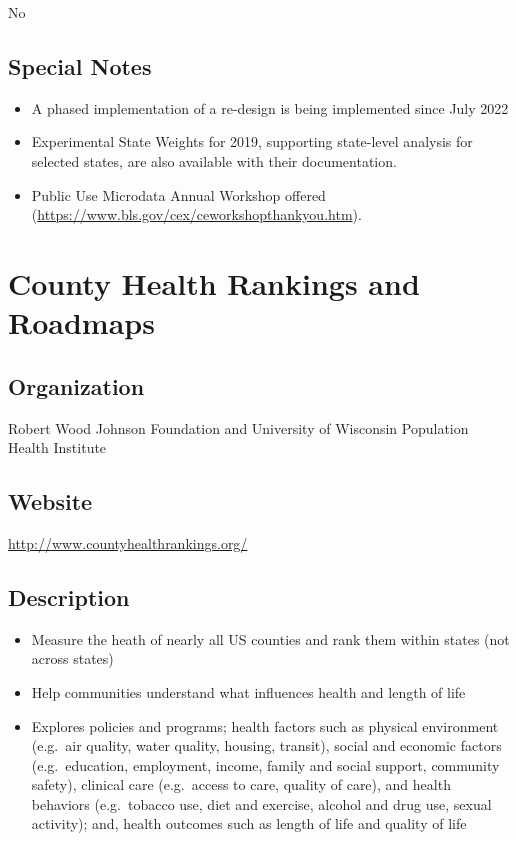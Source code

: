 \documentclass[
]{book}
\providecommand{\tightlist}{%
  \setlength{\itemsep}{0pt}\setlength{\parskip}{0pt}}
\begin{document}
No

\hypertarget{special-notes-19}{%
\section{Special Notes}\label{special-notes-19}}

\begin{itemize}
\tightlist
\item
  A phased implementation of a re-design is being implemented since July 2022
\item
  Experimental State Weights for 2019, supporting state-level analysis for selected states, are also available with their documentation.
\item
  Public Use Microdata Annual Workshop offered (\url{https://www.bls.gov/cex/ceworkshopthankyou.htm}).
\end{itemize}

\mainmatter

\hypertarget{county-health-rankings-and-roadmaps}{%
\chapter{County Health Rankings and Roadmaps}\label{county-health-rankings-and-roadmaps}}

\hypertarget{organization-20}{%
\section{Organization}\label{organization-20}}

Robert Wood Johnson Foundation and University of Wisconsin Population Health Institute

\hypertarget{website-20}{%
\section{Website}\label{website-20}}

\url{http://www.countyhealthrankings.org/}

\hypertarget{description-20}{%
\section{Description}\label{description-20}}

\begin{itemize}
\tightlist
\item
  Measure the heath of nearly all US counties and rank them within states (not across states)
\item
  Help communities understand what influences health and length of life
\item
  Explores policies and programs; health factors such as physical environment (e.g.~air quality, water quality, housing, transit), social and economic factors (e.g.~education, employment, income, family and social support, community safety), clinical care (e.g.~access to care, quality of care), and health behaviors (e.g.~tobacco use, diet and exercise, alcohol and drug use, sexual activity); and, health outcomes such as length of life and quality of life
\end{itemize}
\end{document}
